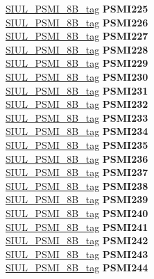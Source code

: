\begin{DoxyCompactItemize}
\begin{tabbing}
\>\>\mbox{\hyperlink{unionSIUL__PSMI__8B__tag}{SIUL\_PSMI\_8B\_tag}} {\bfseries PSMI225}\\
\>\>\mbox{\hyperlink{unionSIUL__PSMI__8B__tag}{SIUL\_PSMI\_8B\_tag}} {\bfseries PSMI226}\\
\>\>\mbox{\hyperlink{unionSIUL__PSMI__8B__tag}{SIUL\_PSMI\_8B\_tag}} {\bfseries PSMI227}\\
\>\>\mbox{\hyperlink{unionSIUL__PSMI__8B__tag}{SIUL\_PSMI\_8B\_tag}} {\bfseries PSMI228}\\
\>\>\mbox{\hyperlink{unionSIUL__PSMI__8B__tag}{SIUL\_PSMI\_8B\_tag}} {\bfseries PSMI229}\\
\>\>\mbox{\hyperlink{unionSIUL__PSMI__8B__tag}{SIUL\_PSMI\_8B\_tag}} {\bfseries PSMI230}\\
\>\>\mbox{\hyperlink{unionSIUL__PSMI__8B__tag}{SIUL\_PSMI\_8B\_tag}} {\bfseries PSMI231}\\
\>\>\mbox{\hyperlink{unionSIUL__PSMI__8B__tag}{SIUL\_PSMI\_8B\_tag}} {\bfseries PSMI232}\\
\>\>\mbox{\hyperlink{unionSIUL__PSMI__8B__tag}{SIUL\_PSMI\_8B\_tag}} {\bfseries PSMI233}\\
\>\>\mbox{\hyperlink{unionSIUL__PSMI__8B__tag}{SIUL\_PSMI\_8B\_tag}} {\bfseries PSMI234}\\
\>\>\mbox{\hyperlink{unionSIUL__PSMI__8B__tag}{SIUL\_PSMI\_8B\_tag}} {\bfseries PSMI235}\\
\>\>\mbox{\hyperlink{unionSIUL__PSMI__8B__tag}{SIUL\_PSMI\_8B\_tag}} {\bfseries PSMI236}\\
\>\>\mbox{\hyperlink{unionSIUL__PSMI__8B__tag}{SIUL\_PSMI\_8B\_tag}} {\bfseries PSMI237}\\
\>\>\mbox{\hyperlink{unionSIUL__PSMI__8B__tag}{SIUL\_PSMI\_8B\_tag}} {\bfseries PSMI238}\\
\>\>\mbox{\hyperlink{unionSIUL__PSMI__8B__tag}{SIUL\_PSMI\_8B\_tag}} {\bfseries PSMI239}\\
\>\>\mbox{\hyperlink{unionSIUL__PSMI__8B__tag}{SIUL\_PSMI\_8B\_tag}} {\bfseries PSMI240}\\
\>\>\mbox{\hyperlink{unionSIUL__PSMI__8B__tag}{SIUL\_PSMI\_8B\_tag}} {\bfseries PSMI241}\\
\>\>\mbox{\hyperlink{unionSIUL__PSMI__8B__tag}{SIUL\_PSMI\_8B\_tag}} {\bfseries PSMI242}\\
\>\>\mbox{\hyperlink{unionSIUL__PSMI__8B__tag}{SIUL\_PSMI\_8B\_tag}} {\bfseries PSMI243}\\
\>\>\mbox{\hyperlink{unionSIUL__PSMI__8B__tag}{SIUL\_PSMI\_8B\_tag}} {\bfseries PSMI244}\\

\end{tabbing}
\end{DoxyCompactItemize}
